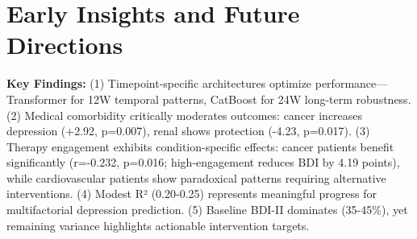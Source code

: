 \documentclass[conference]{IEEEtran}
\begin{document}
\begin{table}[h]
\centering
\caption{Descriptive Statistics by Disease Group (12W BDI)}
\label{tab:descriptive}
\end{table}

\begin{table}[h]
\centering
\caption{Individual Condition Statistical Analysis (12W)}
\label{tab:condition_analysis}
\end{table}

\section{Early Insights and Future Directions}

\textbf{Key Findings:} (1) Timepoint-specific architectures optimize performance—Transformer for 12W temporal patterns, CatBoost for 24W long-term robustness. (2) Medical comorbidity critically moderates outcomes: cancer increases depression (+2.92, p=0.007), renal shows protection (-4.23, p=0.017). (3) Therapy engagement exhibits condition-specific effects: cancer patients benefit significantly (r=-0.232, p=0.016; high-engagement reduces BDI by 4.19 points), while cardiovascular patients show paradoxical patterns requiring alternative interventions. (4) Modest R² (0.20-0.25) represents meaningful progress for multifactorial depression prediction. (5) Baseline BDI-II dominates (35-45\%), yet remaining variance highlights actionable intervention targets.
\end{document}
